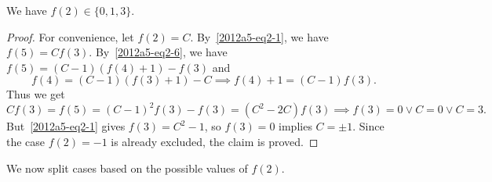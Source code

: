 \begin{claim}
We have $f(2) \in \{0, 1, 3\}$.
\end{claim}
\begin{proof}
For convenience, let $f(2) = C$.
By~\eqref{2012a5-eq2-1}, we have $f(5) = C f(3)$.
By~\eqref{2012a5-eq2-6}, we have $f(5) = (C - 1)(f(4) + 1) - f(3)$ and
\[ f(4) = (C - 1)(f(3) + 1) - C \implies f(4) + 1 = (C - 1) f(3). \]
Thus we get
\[ C f(3) = f(5) = (C - 1)^2 f(3) - f(3) = (C^2 - 2C) f(3) \implies f(3) = 0 \vee C = 0 \vee C = 3. \]
But~\eqref{2012a5-eq2-1} gives $f(3) = C^2 - 1$, so $f(3) = 0$ implies $C = \pm 1$.
Since the case $f(2) = -1$ is already excluded, the claim is proved.
\end{proof}

We now split cases based on the possible values of $f(2)$.

